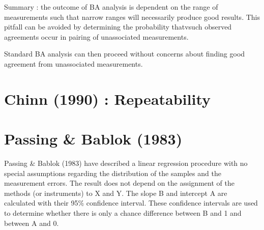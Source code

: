 \documentclass[MAIN.tex]{subfiles}
\begin{document}
Summary : the outcome of BA analysis is dependent on the range of measurements such that narrow ranges will necessarily produce good results.
This pitfall can be avoided by determining the probability thatvsuch observed agreements occur in pairing of unassociated measurements.

Standard BA analysis can then proceed without concerns about finding good agreement from unassociated measurements.



\section*{Chinn (1990) : Repeatability}

\bigskip

\section*{Passing \& Bablok (1983)}
Passing \& Bablok (1983) have described a linear regression procedure with no special assumptions regarding the distribution of the samples and the measurement errors. The result does not depend on the assignment of the methods (or instruments) to X and Y. The slope B and intercept A are calculated with their 95\% confidence interval. These confidence intervals are used to determine whether there is only a chance difference between B and 1 and between A and 0.
\end{document}
